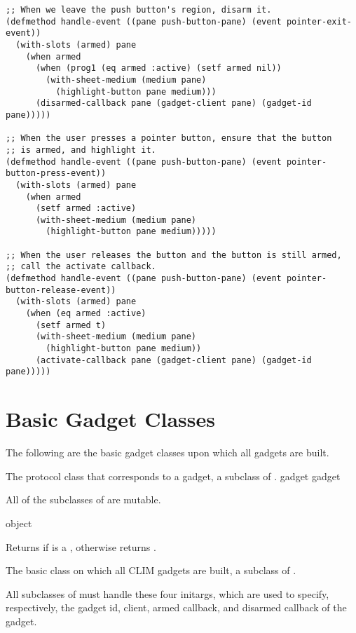 \begin{verbatim}
;; When we leave the push button's region, disarm it.
(defmethod handle-event ((pane push-button-pane) (event pointer-exit-event))
  (with-slots (armed) pane
    (when armed
      (when (prog1 (eq armed :active) (setf armed nil))
        (with-sheet-medium (medium pane)
          (highlight-button pane medium)))
      (disarmed-callback pane (gadget-client pane) (gadget-id pane)))))

;; When the user presses a pointer button, ensure that the button
;; is armed, and highlight it. 
(defmethod handle-event ((pane push-button-pane) (event pointer-button-press-event))
  (with-slots (armed) pane
    (when armed
      (setf armed :active)
      (with-sheet-medium (medium pane)
        (highlight-button pane medium)))))

;; When the user releases the button and the button is still armed,
;; call the activate callback.
(defmethod handle-event ((pane push-button-pane) (event pointer-button-release-event))
  (with-slots (armed) pane
    (when (eq armed :active)
      (setf armed t)
      (with-sheet-medium (medium pane)
        (highlight-button pane medium))
      (activate-callback pane (gadget-client pane) (gadget-id pane)))))
\end{verbatim}


\section {Basic Gadget Classes}

The following are the basic gadget classes upon which all gadgets are built.


The protocol class that corresponds to a gadget, a subclass of .
 {gadget} {gadget}

All of the subclasses of  are mutable.

 {object}

Returns  if  is a , otherwise returns
.


The basic class on which all CLIM gadgets are built, a subclass of .
\AbstractClass


All subclasses of  must handle these four initargs, which are used to
specify, respectively, the gadget id, client, armed callback, and disarmed
callback of the gadget.

